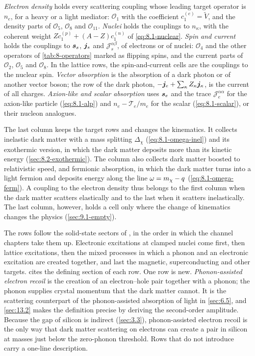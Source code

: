 \emph{Electron density} holds every scattering coupling whose leading target operator is $n_e$, for a heavy or a light mediator: $\mathcal{O}_1$ with the coefficient $c_1^{(e)} = \tilde V$, and the density parts of $\mathcal{O}_5$, $\mathcal{O}_8$ and $\mathcal{O}_{11}$. \emph{Nuclei} holds the couplings to $n_\kappa$, with the coherent weight $Zc_1^{(p)} + (A - Z)c_1^{(n)}$ of \cref{eq:8.1-nuclear}. \emph{Spin and current} holds the couplings to $\bm{s}_s$, $\bm{j}_s$ and $\mathcal{J}^{\alpha\beta}_s$, of electrons or of nuclei: $\mathcal{O}_4$ and the other operators of \cref{tab:8-operators} marked as flipping spins, and the current parts of $\mathcal{O}_2$, $\mathcal{O}_5$ and $\mathcal{O}_8$. In the lattice rows, the spin-and-current cells are the couplings to the nuclear spin. \emph{Vector absorption} is the absorption of a dark photon or of another vector boson; the row of the dark photon, $-\bm{j}_e + \sum_\kappa Z_\kappa\bm{j}_\kappa$, is the current of all charges. \emph{Axion-like and scalar absorption} uses $\bm{s}_e$ and the trace $\mathcal{J}^{\alpha\alpha}_e$ for the axion-like particle (\cref{eq:8.1-alp}) and $n_e - \mathcal{T}_e/m_e$ for the scalar (\cref{eq:8.1-scalar}), or their nucleon analogues.

The last column keeps the target rows and changes the kinematics. It collects inelastic dark matter with a mass splitting $\Delta_\chi$ (\cref{eq:8.1-omega-inel}) and its exothermic version, in which the dark matter deposits more than its kinetic energy (\cref{sec:8.2-exothermic}). The column also collects dark matter boosted to relativistic speed, and fermionic absorption, in which the dark matter turns into a light fermion and deposits energy along the line $\omega = m_{\chi} - q$ (\cref{eq:8.1-omega-ferm}). A coupling to the electron density thus belongs to the first column when the dark matter scatters elastically and to the last when it scatters inelastically. The last column, however, holds a cell only where the change of kinematics changes the physics (\cref{sec:9.1-empty}).

The rows follow the solid-state sectors of , in the order in which the channel chapters take them up. Electronic excitations at clamped nuclei come first, then lattice excitations, then the mixed processes in which a phonon and an electronic excitation are created together, and last the magnetic, superconducting and other targets.  cites the defining section of each row. One row is new. \emph{Phonon-assisted electron recoil} is the creation of an electron--hole pair together with a phonon; the phonon supplies crystal momentum that the dark matter cannot. It is the scattering counterpart of the phonon-assisted absorption of light in \cref{sec:6.5}, and \cref{sec:13.2} makes the definition precise by deriving the second-order amplitude. Because the gap of silicon is indirect (\cref{sec:3.3}), phonon-assisted electron recoil is the only way that dark matter scattering on electrons can create a pair in silicon at masses just below the zero-phonon threshold. Rows that  do not introduce carry a one-line description.

